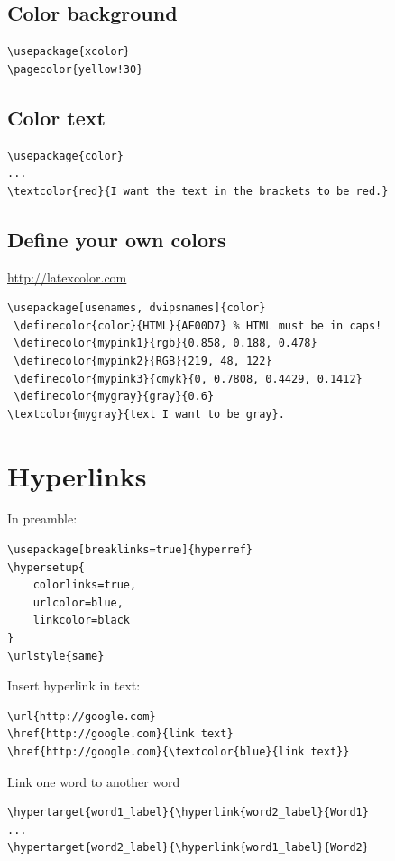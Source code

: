 \documentclass{article}
\begin{document}
\begin{minipage}{0.5\textwidth}
\subsection{Color background }
\begin{verbatim}
\usepackage{xcolor}
\pagecolor{yellow!30}
\end{verbatim}

\subsection{Color text}
\begin{verbatim}
\usepackage{color}
...
\textcolor{red}{I want the text in the brackets to be red.}
\end{verbatim}
\end{minipage}
\begin{minipage}{0.5\textwidth}
\subsection{Define your own colors}\label{definecolors}
\url{http://latexcolor.com}
\begin{verbatim}
\usepackage[usenames, dvipsnames]{color}
 \definecolor{color}{HTML}{AF00D7} % HTML must be in caps!
 \definecolor{mypink1}{rgb}{0.858, 0.188, 0.478}
 \definecolor{mypink2}{RGB}{219, 48, 122}
 \definecolor{mypink3}{cmyk}{0, 0.7808, 0.4429, 0.1412}
 \definecolor{mygray}{gray}{0.6}
\textcolor{mygray}{text I want to be gray}.
\end{verbatim}
\end{minipage}

\section{Hyperlinks}
In preamble:
\begin{lstlisting}
\usepackage[breaklinks=true]{hyperref}
\hypersetup{
    colorlinks=true,
    urlcolor=blue,
    linkcolor=black
}
\urlstyle{same}
\end{lstlisting}

Insert hyperlink in text:
\begin{lstlisting}
\url{http://google.com}
\href{http://google.com}{link text}
\href{http://google.com}{\textcolor{blue}{link text}}
\end{lstlisting}

Link one word to another word
\begin{lstlisting}
\hypertarget{word1_label}{\hyperlink{word2_label}{Word1}
...
\hypertarget{word2_label}{\hyperlink{word1_label}{Word2}
\end{lstlisting}
\end{document}

